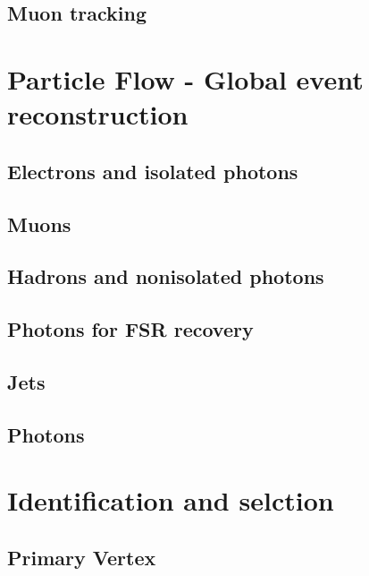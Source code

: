 \subsection{Muon tracking}
\label{sec:muonReco}


\section{Particle Flow - Global event reconstruction}
\label{sec:ParticleFlow}


\subsection{Electrons and isolated photons}

\subsection{Muons}
\todo{}
\subsection{Hadrons and nonisolated photons}


\subsection{Photons for FSR recovery}
\label{sec:FSRphotons}


\subsection{Jets}
\label{sec:jets}


\subsection{Photons}
\label{sec:photons}


\section{Identification and selction}
\subsection{Primary Vertex}


